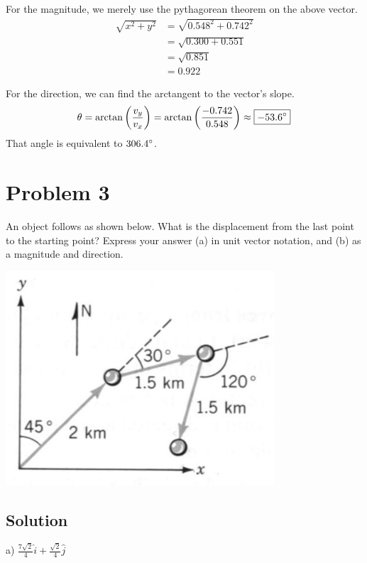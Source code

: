 \documentclass[12pt]{article}
\begin{document}
For the magnitude, we merely use the pythagorean theorem on the above vector.
\begin{align*}
    \sqrt{x^2 + y^2}    &= \sqrt{0.548^2 + 0.742^2}\\
                        &= \sqrt{0.300 + 0.551}\\
                        &= \sqrt{0.851}\\
                        &= \boxed{0.922}
\end{align*}

For the direction, we can find the arctangent to the vector's slope.
\begin{equation*}
    \theta = \arctan \left( \frac{v_y}{v_x} \right) = \arctan \left( \frac{-0.742}{0.548} \right) \approx \boxed{-53.6\degree}
\end{equation*}
That angle is equivalent to $306.4\degree$.


\pagebreak
\section*{Problem 3}
An object follows as shown below. What is the displacement from the last point to the
starting point? Express your answer (a) in unit vector notation, and (b) as a magnitude and direction.

\begin{center}
    \includegraphics*[width=10cm]{graph_3.png}
\end{center}

\subsection*{Solution}
a) $\frac{7\sqrt{2}}{4}\hat{i} + \frac{\sqrt{2}}{4}\hat{j}$
\end{document}
